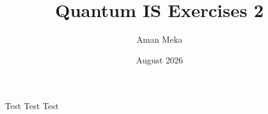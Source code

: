 \documentclass{article}
\title{Quantum IS Exercises 2}
\author{Aman Meka}
\date{August 2026}
\begin{document}
\maketitle

Test Test Test
\end{document}
